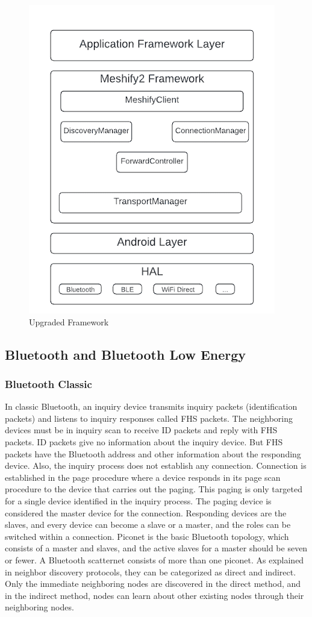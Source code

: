 \documentclass[12pt, conference, onecolumn, a4paper]{IEEEtran}
\begin{document}
\begin{figure}[htbp]
    \centerline{\includegraphics[height=0.45\textwidth]{imgs/classArch.png}}
    \caption{Upgraded Framework}
    \label{figArch}
\end{figure}

\subsection{Bluetooth and Bluetooth Low Energy}

\subsubsection{Bluetooth Classic}

In classic Bluetooth, an inquiry device transmits inquiry packets
(identification packets) and listens to inquiry responses called FHS packets.
The neighboring devices must be in inquiry scan to receive ID packets and reply
with FHS packets. ID packets give no information about the inquiry device. But
FHS packets have the Bluetooth address and other information about the
responding device. Also, the inquiry process does not establish any connection.
Connection is established in the page procedure where a device responds in its
page scan procedure to the device that carries out the paging. This paging is
only targeted for a single device identified in the inquiry process. The paging
device is considered the master device for the connection. Responding devices
are the slaves, and every device can become a slave or a master, and the roles
can be switched within a connection. Piconet is the basic Bluetooth topology,
which consists of a master and slaves, and the active slaves for a master
should be seven or fewer. A Bluetooth scatternet consists of more than one
piconet. As explained in neighbor discovery protocols, they can be categorized
as direct and indirect. Only the immediate neighboring nodes are discovered in
the direct method, and in the indirect method, nodes can learn about other
existing nodes through their neighboring nodes\cite{todtenberg2019}.
\end{document}
